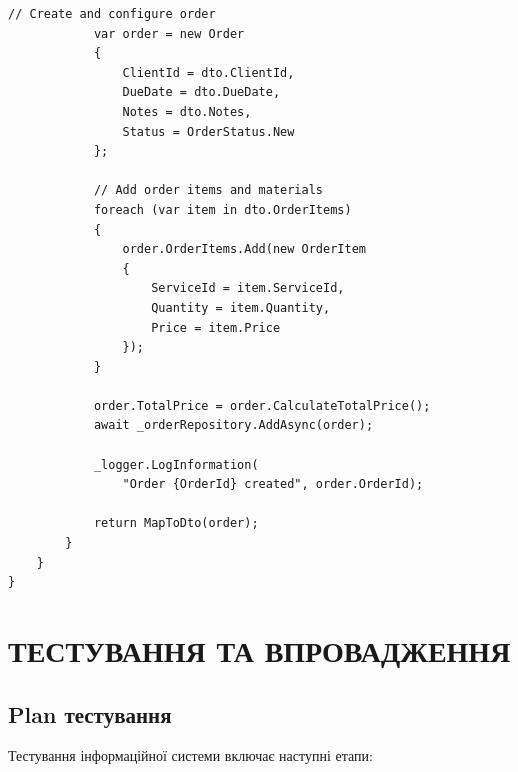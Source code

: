 \documentclass[14pt,a4paper]{extarticle}
\begin{document}
\begin{lstlisting}[language={[Sharp]C}, caption=OrderService з бізнес-логікою, basicstyle=\small\ttfamily, breaklines=true, frame=single]
            // Create and configure order
            var order = new Order
            {
                ClientId = dto.ClientId,
                DueDate = dto.DueDate,
                Notes = dto.Notes,
                Status = OrderStatus.New
            };
            
            // Add order items and materials
            foreach (var item in dto.OrderItems)
            {
                order.OrderItems.Add(new OrderItem
                {
                    ServiceId = item.ServiceId,
                    Quantity = item.Quantity,
                    Price = item.Price
                });
            }
            
            order.TotalPrice = order.CalculateTotalPrice();
            await _orderRepository.AddAsync(order);
            
            _logger.LogInformation(
                "Order {OrderId} created", order.OrderId);
            
            return MapToDto(order);
        }
    }
}
\end{lstlisting}

\newpage
\section{ТЕСТУВАННЯ ТА ВПРОВАДЖЕННЯ}

\subsection{Plan тестування}

Тестування інформаційної системи включає наступні етапи:
\end{document}
